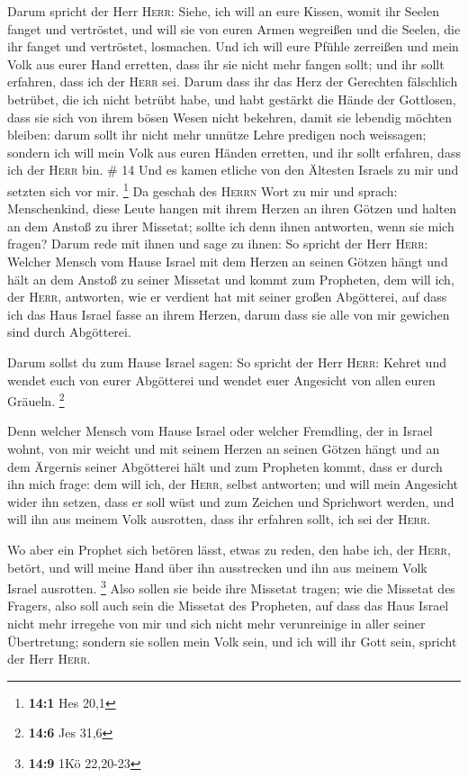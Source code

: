  Darum spricht der Herr \textsc{Herr}: Siehe, ich will an
eure Kissen, womit ihr Seelen fanget und vertröstet, und will sie von
euren Armen wegreißen und die Seelen, die ihr fanget und vertröstet,
losmachen.  Und ich will eure Pfühle zerreißen und mein
Volk aus eurer Hand erretten, dass ihr sie nicht mehr fangen sollt; und
ihr sollt erfahren, dass ich der \textsc{Herr} sei. 
Darum dass ihr das Herz der Gerechten fälschlich betrübet, die ich nicht
betrübt habe, und habt gestärkt die Hände der Gottlosen, dass sie sich
von ihrem bösen Wesen nicht bekehren, damit sie lebendig möchten
bleiben:  darum sollt ihr nicht mehr unnütze Lehre
predigen noch weissagen; sondern ich will mein Volk aus euren Händen
erretten, und ihr sollt erfahren, dass ich der \textsc{Herr} bin. \# 14
 Und es kamen etliche von den Ältesten Israels zu mir und
setzten sich vor mir. \footnote{\textbf{14:1} Hes 20,1} 
Da geschah des \textsc{Herrn} Wort zu mir und sprach: 
Menschenkind, diese Leute hangen mit ihrem Herzen an ihren Götzen und
halten an dem Anstoß zu ihrer Missetat; sollte ich denn ihnen antworten,
wenn sie mich fragen?  Darum rede mit ihnen und sage zu
ihnen: So spricht der Herr \textsc{Herr}: Welcher Mensch vom Hause
Israel mit dem Herzen an seinen Götzen hängt und hält an dem Anstoß zu
seiner Missetat und kommt zum Propheten, dem will ich, der
\textsc{Herr}, antworten, wie er verdient hat mit seiner großen
Abgötterei,  auf dass ich das Haus Israel fasse an ihrem
Herzen, darum dass sie alle von mir gewichen sind durch Abgötterei.

 Darum sollst du zum Hause Israel sagen: So spricht der
Herr \textsc{Herr}: Kehret und wendet euch von eurer Abgötterei und
wendet euer Angesicht von allen euren Gräueln. \footnote{\textbf{14:6}
  Jes 31,6}

 Denn welcher Mensch vom Hause Israel oder welcher
Fremdling, der in Israel wohnt, von mir weicht und mit seinem Herzen an
seinen Götzen hängt und an dem Ärgernis seiner Abgötterei hält und zum
Propheten kommt, dass er durch ihn mich frage: dem will ich, der
\textsc{Herr}, selbst antworten;  und will mein Angesicht
wider ihn setzen, dass er soll wüst und zum Zeichen und Sprichwort
werden, und will ihn aus meinem Volk ausrotten, dass ihr erfahren sollt,
ich sei der \textsc{Herr}.

 Wo aber ein Prophet sich betören lässt, etwas zu reden,
den habe ich, der \textsc{Herr}, betört, und will meine Hand über ihn
ausstrecken und ihn aus meinem Volk Israel ausrotten. \footnote{\textbf{14:9}
  1Kö 22,20-23}  Also sollen sie beide ihre Missetat
tragen; wie die Missetat des Fragers, also soll auch sein die Missetat
des Propheten,  auf dass das Haus Israel nicht mehr
irregehe von mir und sich nicht mehr verunreinige in aller seiner
Übertretung; sondern sie sollen mein Volk sein, und ich will ihr Gott
sein, spricht der Herr \textsc{Herr}.


